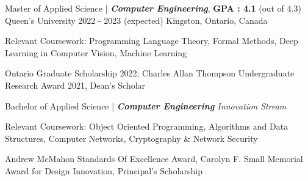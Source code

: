 

\begin{cventries}

  \cventry
    {Master of Applied Science | \textit{\textbf{Computer Engineering}}, \textbf{GPA : 4.1} (out of 4.3)} %
    {Queen's University} %
    {2022 - 2023 (expected)} %
    {Kingston, Ontario, Canada} %
    {
    \begin{cvitems} %
        \item {Relevant Coursework: Programming Language Theory, Formal Methods, Deep Learning in Computer Vision, Machine Learning}
        \item{Ontario Graduate Scholarship 2022; Charles Allan Thompson Undergraduate Research Award 2021, Dean's Scholar}
      \end{cvitems}
    }
  \cventry
    {Bachelor of Applied Science | \textit{\textbf{Computer Engineering} Innovation Stream}} %
    {} %
    {} %
    {} %
    {
    \begin{cvitems} %
        \item {Relevant Coursework: Object Oriented Programming, Algorithms and Data Structures, Computer Networks, Cryptography \& Network Security} %
        \item{Andrew McMahon Standards Of Excellence Award, Carolyn F. Small Memorial Award for Design Innovation, Principal's Scholarship}
      \end{cvitems}
    }
    \cventry{}{}{}{}{}
\end{cventries}
